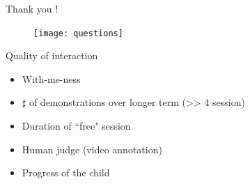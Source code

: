 \documentclass[compress]{beamer}
\begin{document}
\begin{frame}{Thank you !}
	\begin{figure}
        \centering
        \texttt{[image: questions]}
    \end{figure}
\end{frame}



\begin{frame}{Quality of interaction}
\begin{itemize}
\item With-me-ness
\item $\sharp$ of demonstrations over longer term (>> 4 session)
\item Duration of ``free" session
\item Human judge (video annotation)
\item Progress of the child
\end{itemize}
\end{frame}
\end{document}
